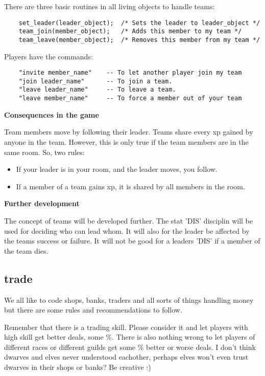 There are three basic routines in all living objects to handle teams:

\begin{verbatim}
    set_leader(leader_object);  /* Sets the leader to leader_object */
    team_join(member_object);   /* Adds this member to my team */
    team_leave(member_object);  /* Removes this member from my team */
\end{verbatim}

Players have the commands:

\begin{verbatim}
    "invite member_name"    -- To let another player join my team
    "join leader_name"      -- To join a team.
    "leave leader_name"     -- To leave a team.
    "leave member_name"     -- To force a member out of your team
\end{verbatim}

{\bf Consequences in the game}

Team members move by following their leader. Teams share every xp gained by 
anyone in the team. However, this is only true if the team members are in
the same room. So, two rules:

\begin{itemize}
    \item  If your leader is in your room, and the leader moves, you follow.
    \item  If a member of a team gains xp, it is shared by all members in the
      room.
\end{itemize}

{\bf Further development}

The concept of teams will be developed further. The stat 'DIS' disciplin will
be used for deciding who can lead whom. It will also for the leader be
affected by the teams success or failure. It will not be good for a leaders
'DIS' if a member of the team dies.


\subsection{trade}

We all like to code shops, banks, traders and all sorts of things
handling money but there are some rules and recommendations to
follow.

Remember that there is a trading skill. Please consider it and
let players with high skill get better deals, some \%. There is
also nothing wrong to let players of different races or different
guilds get some \% better or worse deals. I don't think dwarves 
and elves never understood eachother, perhaps elves won't even
trust dwarves in their shops or banks? Be creative :)

